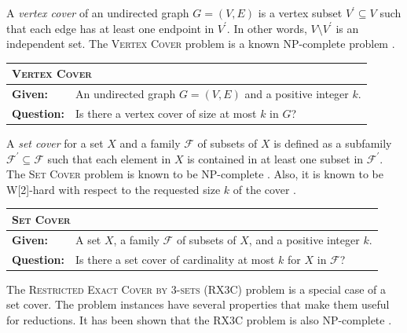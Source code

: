 \documentclass[
    12pt,               %
    a4paper,            %
    bibtotoc,           %
    pointlessnumbers,   %
    ngerman,            %
    titlepage,          %
    leqno,              %
    ]{scrarticle}       %
\begin{document}
\vspace{\baselineskip}



A \emph{vertex cover} of an undirected graph $G = (V, E)$ is a vertex subset $V^\prime \subseteq V$ such that each edge has at least one endpoint in $V^\prime$. In other words, $V \setminus V^\prime$ is an independent set. The \textsc{Vertex Cover} problem is a known NP-complete problem \cite{K72}.

\begin{tabularx}{\textwidth}{lX}
\hline
\multicolumn{2}{l}{
\textsc{Vertex Cover}
} \\
\hline
\textbf{Given:} &
An undirected graph $G = (V, E)$ and a positive integer $k$. \\
\textbf{Question:} &
Is there a vertex cover of size at most $k$ in $G$? \\
\hline
\end{tabularx}

\vspace{\baselineskip}



A \emph{set cover} for a set $X$ and a family $\mathcal{F}$ of subsets of $X$ is defined as a subfamily $\mathcal{F}^\prime \subseteq \mathcal{F}$ such that each element in $X$ is contained in at least one subset in $\mathcal{F}^\prime$. The \textsc{Set Cover} problem is known to be NP-complete \cite{K72}. Also, it is known to be W[2]-hard with respect to the requested size $k$ of the cover \cite{DF95}.

\begin{tabularx}{\textwidth}{lX}
\hline
\multicolumn{2}{l}{
\textsc{Set Cover}
} \\
\hline
\textbf{Given:} &
A set $X$, a family $\mathcal{F}$ of subsets of $X$, and a positive integer $k$. \\
\textbf{Question:} &
Is there a set cover of cardinality at most $k$ for $X$ in $\mathcal{F}$? \\
\hline
\end{tabularx}

\vspace{\baselineskip}



The \textsc{Restricted Exact Cover by 3-sets} (RX3C) problem is a special case of a set cover. The problem instances have several properties that make them useful for reductions. It has been shown that the RX3C problem is also NP-complete \cite[Theorem A.1]{G85}.
\end{document}
